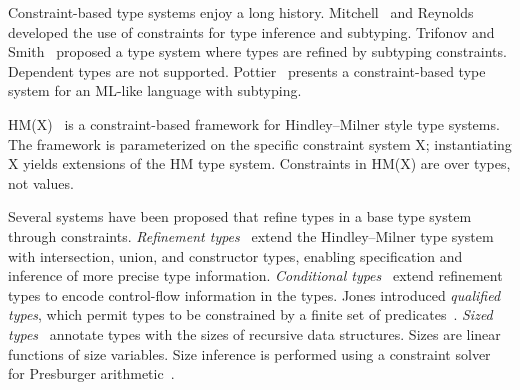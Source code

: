 Constraint-based type systems enjoy a long history.
Mitchell~\cite{mitchell84} and Reynolds~\cite{reynolds85}
developed the use of constraints for type inference and subtyping.
%
Trifonov and Smith~\cite{trifonov96}
proposed a type system where types are refined by subtyping
constraints.  Dependent types are not supported.
%
Pottier~\cite{pottier96simplifying,pottier01b}
presents a constraint-based type system for an ML-like language with
subtyping.

HM(X)~\cite{sulzmann97type,pottier01a,pottier-remy-attapl}
is a constraint-based framework
for Hindley--Milner style type systems.
The framework is parameterized on the specific constraint system
X; instantiating X yields extensions of the HM type system.
Constraints in HM(X) are over types, not values.
%












Several systems have been proposed that refine types in a base
type system through constraints.
%
{\em Refinement types}~\cite{refinement-types} extend the 
Hindley--Milner type system with intersection, union, and
constructor types, enabling specification and inference of
more precise type information.
%
{\em Conditional
types}~\cite{conditional-types} extend refinement types to
encode control-flow information in the types.
%
Jones introduced {\em qualified types}, which permit
types to be constrained by a finite set of
predicates~\cite{jones94}.
%
{\em Sized types}~\cite{sized-types}
annotate types with the sizes of recursive data structures.
Sizes are linear functions of size variables.
Size inference is performed using a constraint solver for
Presburger arithmetic~\cite{omega}.

